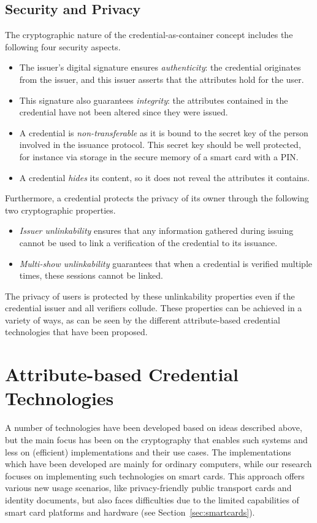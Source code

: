 \subsection{Security and Privacy}

The cryptographic nature of the credential-as-container concept includes the
following four security aspects.
\begin{itemize}
  \item The issuer's digital signature ensures \emph{authenticity}:
     the credential originates from the issuer, and this
    issuer asserts that the attributes hold for the user.
  \item This signature also guarantees \emph{integrity}:  the
    attributes contained in the credential have not been altered since they were
    issued.
  \item A credential is \emph{non-transferable} as
    it is bound to the secret key of the person involved in the issuance
    protocol. This secret key should be well protected, for instance via storage
    in the secure memory of a smart card with a PIN.
  \item A credential \emph{hides} its content, so it does not
    reveal the attributes it contains.
\end{itemize}
Furthermore, a credential protects the privacy of its owner
through the following two cryptographic properties.
\begin{itemize}
  \item \emph{Issuer unlinkability} ensures that any information gathered
    during issuing cannot be used to link a verification of the credential to
    its issuance.
  \item \emph{Multi-show unlinkability} guarantees that when a credential is
    verified multiple times, these sessions cannot be linked.
\end{itemize}
The privacy of users is protected by these unlinkability properties even if the
credential issuer and all verifiers collude. These properties can be achieved in
a variety of ways, as can be seen by the different attribute-based credential
technologies that have been proposed.

\section{Attribute-based Credential Technologies}

A number of technologies have been developed based on ideas described above, but
the main focus has been on the cryptography that enables such systems and less
on (efficient) implementations and their use cases. The implementations which
have been developed are mainly for ordinary computers, while our research
focuses on implementing such technologies on smart cards. This approach offers
various new usage scenarios, like privacy-friendly public transport cards and
identity documents, but also faces difficulties due to the limited capabilities
of smart card platforms and hardware (see Section~\ref{sec:smartcards}).

